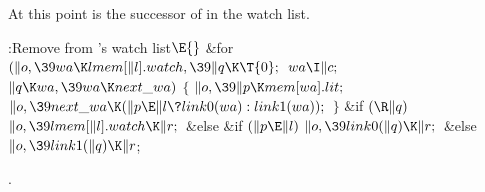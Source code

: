 At this point  is the successor of  in the
watch list.

\Y\B\4:Remove  from 's watch list\X${}\E{}$\6
\&{for} ${}(\|o,\39\\{wa}\K\\{lmem}[\|l].\\{watch},\39\|q\K\T{0};{}$ ${}\\{wa}%
\I\|c;{}$ ${}\|q\K\\{wa},\39\\{wa}\K\\{next\_wa}){}$\5
${}\{{}$\1\6
${}\|o,\39\|p\K\\{mem}[\\{wa}].\\{lit};{}$\6
${}\|o,\39\\{next\_wa}\K(\|p\E\|l\?\\{link0}(\\{wa}):\\{link1}(\\{wa}));{}$\6
\4${}\}{}$\2\6
\&{if} ${}(\R\|q){}$\1\5
${}\|o,\39\\{lmem}[\|l].\\{watch}\K\|r;{}$\2\6
\&{else} \&{if} ${}(\|p\E\|l){}$\1\5
${}\|o,\39\\{link0}(\|q)\K\|r;{}$\2\6
\&{else}\1\5
${}\|o,\39\\{link1}(\|q)\K\|r{}$;\2\par
{}.\fi

